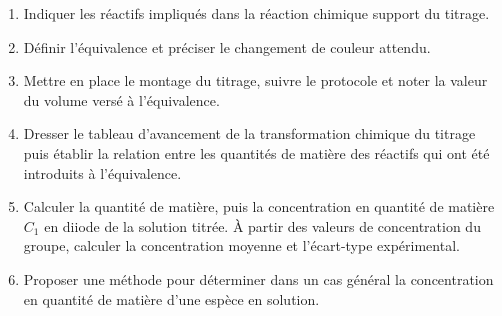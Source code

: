 \documentclass[a4paper,11pt,fleqn]{scrartcl}%
\begin{document}
    \begin{question}
        \begin{enumerate}
            \item Indiquer les réactifs impliqués dans la réaction chimique support du titrage.
            \item Définir l'équivalence et préciser le changement de couleur attendu.
            \item Mettre en place le montage du titrage, suivre le protocole et noter la valeur du volume versé à l'équivalence.
            \item Dresser le tableau d'avancement de la transformation chimique du titrage puis établir la relation entre les quantités de matière des réactifs qui ont été introduits à l'équivalence.
            \item Calculer la quantité de matière, puis la concentration en quantité de matière $C_1$ en diiode de la solution titrée. À partir des valeurs de concentration du groupe, calculer la concentration moyenne et l'écart-type expérimental.
            \item Proposer une méthode pour déterminer dans un cas général la concentration en quantité de matière d'une espèce en solution.
        \end{enumerate}
    \end{question}
\end{document}
